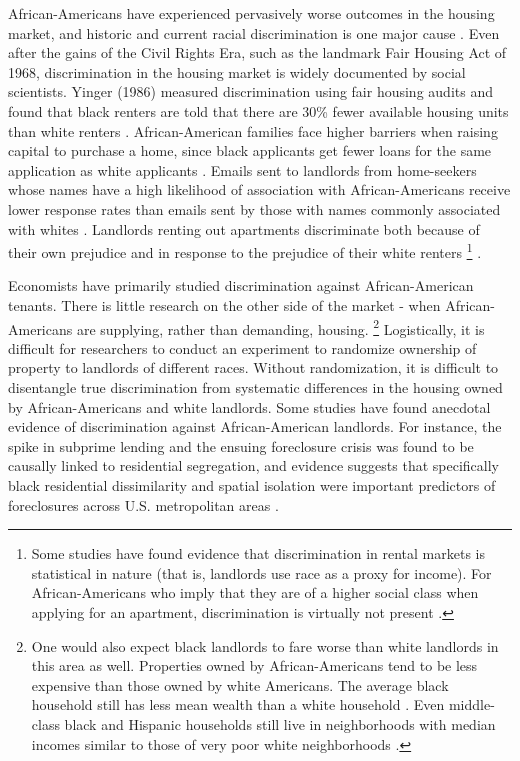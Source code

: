 
African-Americans have experienced pervasively worse outcomes in the housing market, and historic and current racial discrimination is one major cause \citep{krysan}. Even after the gains of the Civil Rights Era, such as the landmark Fair Housing Act of 1968, discrimination in the housing market is widely documented by social scientists. Yinger (1986) measured discrimination using fair housing audits and found that black renters are told that there are 30\% fewer available housing units than white renters \citep{yinger1}. African-American families face higher barriers when raising capital to purchase a home, since black applicants get fewer loans for the same application as white applicants \citep{pope}. Emails sent to landlords from home-seekers whose names have a high likelihood of association with African-Americans receive lower response rates than emails sent by those with names commonly associated with whites \citep{hanson}. Landlords renting out apartments discriminate both because of their own prejudice and in response to the prejudice of their white renters%
	\footnote{Some studies have found evidence that discrimination in rental markets is statistical in nature (that is, landlords use race as a proxy for income). For African-Americans who imply that they are of a higher social class when applying for an apartment, discrimination is virtually not present \citep{hanson}.}
\citep{ondrich}.

Economists have primarily studied discrimination against African-American tenants. There is little research on the other side of the market - when African-Americans are supplying, rather than demanding, housing.%
	\footnote{One would also expect black landlords to fare worse than white landlords in this area as well. Properties owned by African-Americans tend to be less expensive than those owned by white Americans. The average black household still has less mean wealth than a white household \citep{oliver}. Even middle-class black and Hispanic households still live in neighborhoods with median incomes similar to those of very poor white neighborhoods \citep{reardon}.} 
Logistically, it is difficult for researchers to conduct an experiment to randomize ownership of property to landlords of different races. Without randomization, it is difficult to disentangle true discrimination from systematic differences in the housing owned by African-Americans and white landlords. Some studies have found anecdotal evidence of discrimination against African-American landlords. For instance, the spike in subprime lending and the ensuing foreclosure crisis was found to be causally linked to residential segregation, and evidence suggests that specifically black residential dissimilarity and spatial isolation were important predictors of foreclosures across U.S. metropolitan areas \citep{foreclosure}.

